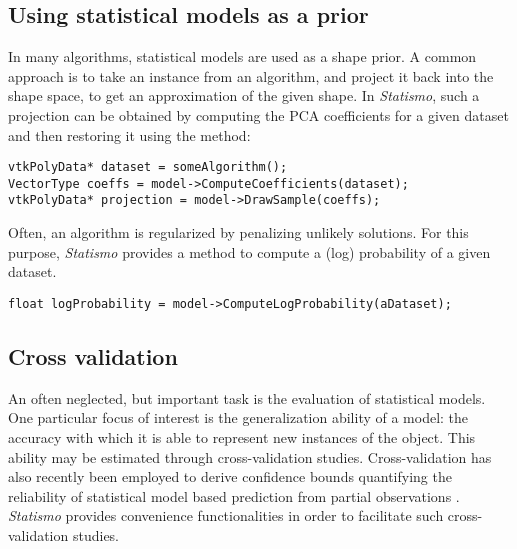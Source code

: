 \documentclass{InsightArticle}
\newcommand{\Statismo}{\emph{Statismo}\xspace}
\begin{document}
\subsection{Using statistical models as  a prior}
In many algorithms, statistical models are used as a shape prior. 
A common approach is to take an instance from an algorithm, and project it back into the 
shape space, to get an approximation of the given shape. In \Statismo, such a projection can be
obtained by computing the PCA coefficients for a given dataset and then restoring it using the 
 method:
\begin{verbatim}
vtkPolyData* dataset = someAlgorithm();
VectorType coeffs = model->ComputeCoefficients(dataset);
vtkPolyData* projection = model->DrawSample(coeffs);
\end{verbatim}
Often, an algorithm is regularized by penalizing unlikely solutions. For this purpose, \Statismo 
provides a method to compute a (log) probability of a given dataset. 
\begin{verbatim}
float logProbability = model->ComputeLogProbability(aDataset);
\end{verbatim}

\subsection{Cross validation}
An often neglected, but important task is the evaluation of
statistical models. One particular focus of interest is the
generalization ability of a model: the accuracy with which it is able to represent new instances of the object. 
This ability may be estimated through cross-validation studies. Cross-validation has also recently been employed
to derive confidence bounds quantifying the reliability of statistical model based prediction from partial observations \cite{blanc_estimating_2009,blanc_confidence_2012}. \Statismo provides convenience functionalities in order to facilitate such cross-validation studies. 
\end{document}
